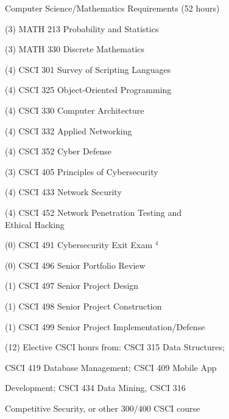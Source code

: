 \begin{reqgroup}{Computer Science/Mathematics Requirements (52 hours)}
\begin{checklist}
\begin{minipage}[t]{0.5\linewidth}
	\item (3) MATH 213 Probability and Statistics
	\item (3) MATH 330 Discrete Mathematics
	\item (4) CSCI 301 Survey of Scripting Languages
	\item (4) CSCI 325 Object-Oriented Programming
	\item (4) CSCI 330 Computer Architecture
	\item (4) CSCI 332 Applied Networking
	\item (4) CSCI 352 Cyber Defense
	\item (3) CSCI 405 Principles of Cybersecurity
	\item (4) CSCI 433 Network Security
	\item (4) CSCI 452 Network Penetration Testing and\\Ethical Hacking
\end{minipage}
\begin{minipage}[t]{0.5\linewidth}
	\item (0) CSCI 491 Cybersecurity Exit Exam $^4$
	\item (0) CSCI 496 Senior Portfolio Review
	\item (1) CSCI 497 Senior Project Design
	\item (1) CSCI 498 Senior Project Construction
	\item (1) CSCI 499 Senior Project Implementation/Defense
	\item (12) Elective CSCI hours from: CSCI 315 Data Structures;
	\item \hspace{1em} CSCI 419 Database Management; CSCI 409 Mobile App
	\item \hspace{1em} Development; CSCI 434 Data Mining, CSCI 316
	\item[] \hspace{1em} Competitive Security, or other 300/400 CSCI course


\end{minipage}
\end{checklist}
\end{reqgroup}

